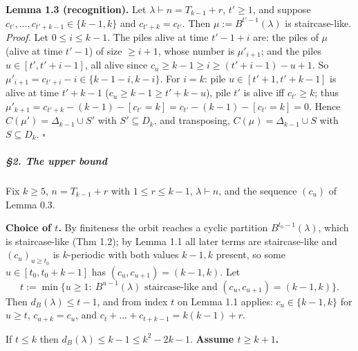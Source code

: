 \documentclass[11pt,a4paper]{article}
\begin{document}
\textbf{Lemma 1.3 (recognition).} Let \(\lambda\vdash n=T_{k-1}+r\),
\(t'\ge1\), and suppose \(c_{t'},\dots,c_{t'+k-1}\in\{k-1,k\}\) and
\(c_{t'+k}=c_{t'}\). Then \(\mu:=B^{t'-1}(\lambda)\) is staircase-like.
\emph{Proof.} Let \(0\le i\le k-1\). The piles alive at time \(t'-1+i\)
are: the piles of \(\mu\) (alive at time \(t'-1\)) of size \(\ge i+1\),
whose number is \(\mu'_{i+1}\); and the piles \(u\in[t',t'+i-1]\), all
alive since \(c_u\ge k-1\ge i\ge (t'+i-1)-u+1\). So
\(\mu'_{i+1}=c_{t'+i}-i\in\{k-1-i,k-i\}\). For \(i=k\): pile
\(u\in[t'+1,t'+k-1]\) is alive at time \(t'+k-1\)
(\(c_u\ge k-1\ge t'+k-u\)), pile \(t'\) is alive iff \(c_{t'}\ge k\);
thus \(\mu'_{k+1}=c_{t'+k}-(k-1)-[c_{t'}=k]=c_{t'}-(k-1)-[c_{t'}=k]=0\).
Hence \(C(\mu')=\Delta_{k-1}\cup S'\) with \(S'\subseteq D_k\), and
transposing, \(C(\mu)=\Delta_{k-1}\cup S\) with \(S\subseteq D_k\).
\(\square\)

\subparagraph{§2. The upper bound}\label{the-upper-bound}

Fix \(k\ge5\), \(n=T_{k-1}+r\) with \(1\le r\le k-1\),
\(\lambda\vdash n\), and the sequence \((c_u)\) of Lemma 0.3.

\textbf{Choice of \(t\).} By finiteness the orbit reaches a cyclic
partition \(B^{t_0-1}(\lambda)\), which is staircase-like (Thm 1.2); by
Lemma 1.1 all later terms are staircase-like and \((c_u)_{u\ge t_0}\) is
\(k\)-periodic with both values \(k-1,k\) present, so some
\(u\in[t_0,t_0+k-1]\) has \((c_u,c_{u+1})=(k-1,k)\). Let
\[t:=\min\{u\ge1:\ B^{u-1}(\lambda)\text{ staircase-like and }(c_u,c_{u+1})=(k-1,k)\}.\]
Then \(d_B(\lambda)\le t-1\), and from index \(t\) on Lemma 1.1 applies:
\(c_{u}\in\{k-1,k\}\) for \(u\ge t\), \(c_{u+k}=c_u\), and
\(c_t+\dots+c_{t+k-1}=k(k-1)+r\).

If \(t\le k\) then \(d_B(\lambda)\le k-1\le k^2-2k-1\). \textbf{Assume
\(t\ge k+1\).}
\end{document}
